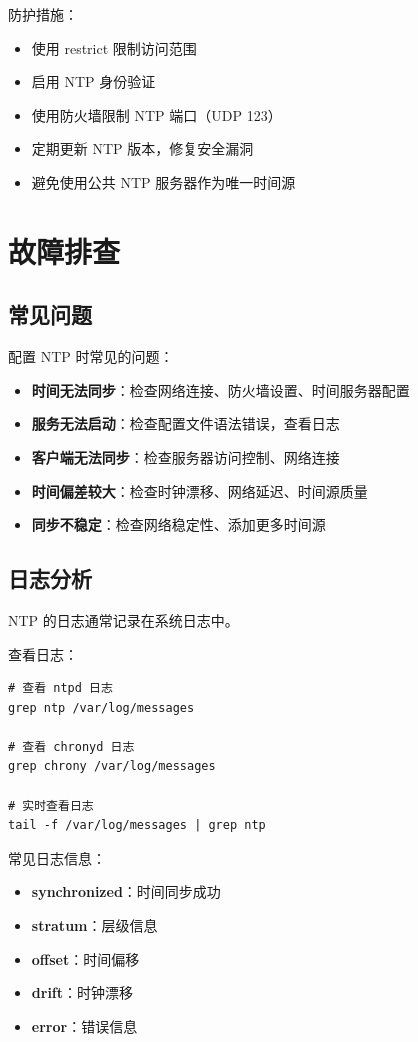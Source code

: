 \documentclass[12pt,UTF8]{ctexbook}
\begin{document}
防护措施：
\begin{itemize}
    \item 使用 restrict 限制访问范围
    \item 启用 NTP 身份验证
    \item 使用防火墙限制 NTP 端口（UDP 123）
    \item 定期更新 NTP 版本，修复安全漏洞
    \item 避免使用公共 NTP 服务器作为唯一时间源
\end{itemize}

\chapter{故障排查}
\label{chap:troubleshooting}

\section{常见问题}
\label{sec:common_problems}

配置 NTP 时常见的问题：

\begin{itemize}
    \item \textbf{时间无法同步}：检查网络连接、防火墙设置、时间服务器配置
    \item \textbf{服务无法启动}：检查配置文件语法错误，查看日志
    \item \textbf{客户端无法同步}：检查服务器访问控制、网络连接
    \item \textbf{时间偏差较大}：检查时钟漂移、网络延迟、时间源质量
    \item \textbf{同步不稳定}：检查网络稳定性、添加更多时间源
\end{itemize}

\section{日志分析}
\label{sec:log_analysis}

NTP 的日志通常记录在系统日志中。

查看日志：
\begin{verbatim}
# 查看 ntpd 日志
grep ntp /var/log/messages

# 查看 chronyd 日志
grep chrony /var/log/messages

# 实时查看日志
tail -f /var/log/messages | grep ntp
\end{verbatim}

常见日志信息：
\begin{itemize}
    \item \textbf{synchronized}：时间同步成功
    \item \textbf{stratum}：层级信息
    \item \textbf{offset}：时间偏移
    \item \textbf{drift}：时钟漂移
    \item \textbf{error}：错误信息
\end{itemize}
\end{document}
